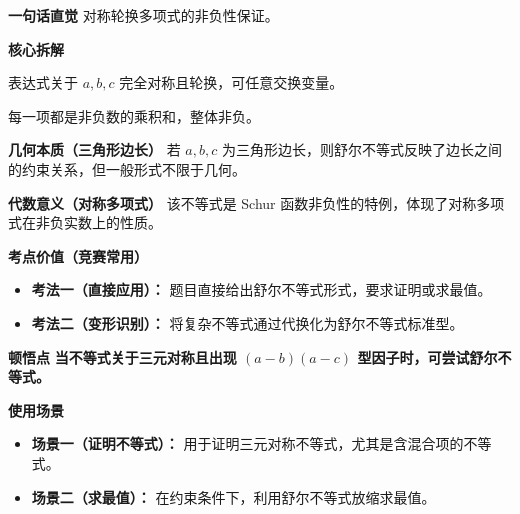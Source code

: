 \begin{explanationbox}
\textbf{\textcolor{CExplanation}{一句话直觉}}
对称轮换多项式的非负性保证。

\medskip
\textbf{\textcolor{CExplanation}{核心拆解}}
\begin{description}[style=nextline, leftmargin=2.8em, labelsep=0.5em, itemsep=0.45em]
    \item[\textbf{要点一（对称轮换）：}] 表达式关于 $a, b, c$ 完全对称且轮换，可任意交换变量。
    \item[\textbf{要点二（非负构造）：}] 每一项都是非负数的乘积和，整体非负。
\end{description}

\medskip
\textbf{\textcolor{CExplanation}{几何本质（三角形边长）}}
若 $a, b, c$ 为三角形边长，则舒尔不等式反映了边长之间的约束关系，但一般形式不限于几何。

\medskip
\textbf{\textcolor{CExplanation}{代数意义（对称多项式）}}
该不等式是 Schur 函数非负性的特例，体现了对称多项式在非负实数上的性质。

\medskip
\textbf{\textcolor{CExplanation}{考点价值（竞赛常用）}}
\begin{itemize}[leftmargin=*, itemsep=0.5em, topsep=0.4em]
    \item \textbf{考法一（直接应用）：} 题目直接给出舒尔不等式形式，要求证明或求最值。
    \item \textbf{考法二（变形识别）：} 将复杂不等式通过代换化为舒尔不等式标准型。
\end{itemize}

\medskip
\textbf{\textcolor{CExplanation}{顿悟点}}
\textbf{当不等式关于三元对称且出现 $(a-b)(a-c)$ 型因子时，可尝试舒尔不等式。}

\medskip
\textbf{\textcolor{CExplanation}{使用场景}}
\begin{itemize}[leftmargin=*, itemsep=0.5em, topsep=0.4em]
    \item \textbf{场景一（证明不等式）：} 用于证明三元对称不等式，尤其是含混合项的不等式。
    \item \textbf{场景二（求最值）：} 在约束条件下，利用舒尔不等式放缩求最值。
\end{itemize}
\end{explanationbox}
